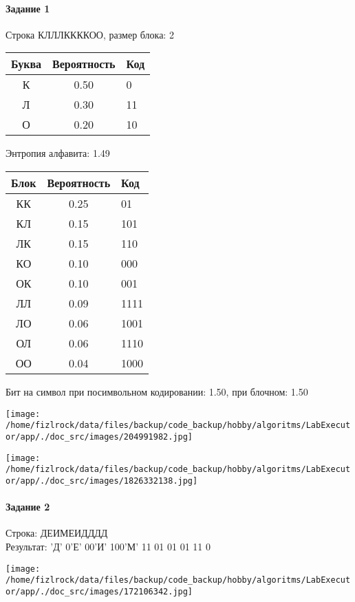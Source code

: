 \documentclass[a4paper, 12pt]{article}
\begin{document}
\paragraph{Задание 1}

Строка КЛЛЛККККОО, размер блока: 2
\begin{center}
 \begin{tabular}{ |c|c|l| } 
  \hline
     Буква & Вероятность & Код\\ \hline
К & 0.50 & 0\\\hline
Л & 0.30 & 11\\\hline
О & 0.20 & 10
\\ \hline \end{tabular}
\end{center}
Энтропия алфавита: 1.49
\begin{center}
 \begin{tabular}{ |c|c|l| } 
  \hline
     Блок & Вероятность & Код\\ \hline
КК & 0.25 & 01\\\hline
КЛ & 0.15 & 101\\\hline
ЛК & 0.15 & 110\\\hline
КО & 0.10 & 000\\\hline
ОК & 0.10 & 001\\\hline
ЛЛ & 0.09 & 1111\\\hline
ЛО & 0.06 & 1001\\\hline
ОЛ & 0.06 & 1110\\\hline
ОО & 0.04 & 1000
\\ \hline \end{tabular}
\end{center}
Бит на символ при посимвольном кодировании: 1.50, при блочном: 1.50

\texttt{[image: /home/fizlrock/data/files/backup/code\_backup/hobby/algoritms/LabExecutor/app/./doc\_src/images/204991982.jpg]}

\texttt{[image: /home/fizlrock/data/files/backup/code\_backup/hobby/algoritms/LabExecutor/app/./doc\_src/images/1826332138.jpg]}
\pagebreak
\paragraph{Задание 2}

Строка: 
ДЕИМЕИДДДД\\
Результат: 'Д' 0'Е' 00'И' 100'М' 11 01 01 01 11 0

\texttt{[image: /home/fizlrock/data/files/backup/code\_backup/hobby/algoritms/LabExecutor/app/./doc\_src/images/172106342.jpg]}
\end{document}
